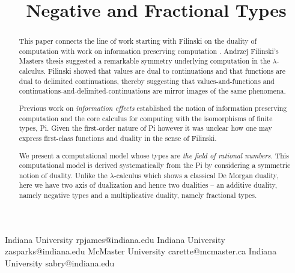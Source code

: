\documentclass[preprint]{sigplanconf}
\newcommand{\lcal}{\ensuremath{\lambda}-calculus\xspace}
\begin{document}
\CopyrightYear{}
\copyrightdata{}
\titlebanner{}
\preprintfooter{}

\title{Negative and Fractional Types} 

           {Indiana University}
           {rpjames@indiana.edu}
           {Indiana University}
           {zasparks@indiana.edu}
           {McMaster University}
           {carette@mcmaster.ca}
           {Indiana University}
           {sabry@indiana.edu}

\maketitle

\begin{abstract}

  This paper connects the line of work starting with
  Filinski\cite{Filinski:1989:DCI:648332.755574} on the duality of
  computation \cite{Curien:2000,DBLP:conf/rta/Wadler05} with work on
  information preserving computation \cite{infeffects,rc2011}.
  Andrzej Filinski's Masters thesis
  \cite{Filinski:1989:DCI:648332.755574} suggested a remarkable
  symmetry underlying computation in the \lcal. Filinski showed that
  values are dual to continuations and that functions are dual to
  delimited continuations, thereby suggesting that
  values-and-functions and continuations-and-delimited-continuations
  are mirror images of the same phenomena.

  Previous work on \emph{information effects} established the notion
  of information preserving computation \cite{infeffects} and the core
  calculus for computing with the isomorphisms of finite types,
  {{Pi}}. Given the first-order nature of {{Pi}} however it was
  unclear how one may express first-class functions and duality in the
  sense of Filinski.

  We present a computational model whose types are \emph{the field of
    rational numbers}. This computational model is derived
  systematically from the {{Pi}} by considering a symmetric notion of
  duality. Unlike the \lcal which shows a classical De Morgan duality,
  here we have two axis of dualization and hence two dualities -- an
  additive duality, namely negative types and a multiplicative
  duality, namely fractional types.


\end{abstract}
\end{document}
